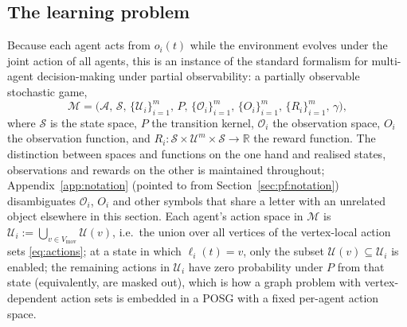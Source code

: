 \documentclass[../main.tex]{subfiles}
\begin{document}
\subsection{The learning problem}
\label{sec:pf:game}

Because each agent acts from $o_i(t)$ while the environment evolves under the
joint action of all agents, this is an instance of the standard formalism for
multi-agent decision-making under partial observability: a partially
observable stochastic game,
\begin{equation}
  \mathcal{M} = \bigl( \mathcal{A},\, \mathcal{S},\, \{\mathcal{U}_i\}_{i=1}^{m},\,
                       P,\, \{\mathcal{O}_i\}_{i=1}^{m},\, \{O_i\}_{i=1}^{m},\,
                       \{R_i\}_{i=1}^{m},\, \gamma \bigr),
  \label{eq:posg}
\end{equation}
where $\mathcal{S}$ is the state space, $P$ the transition kernel,
$\mathcal{O}_i$ the observation space, $O_i$ the observation function, and
$R_i : \mathcal{S} \times \mathcal{U}^m \times \mathcal{S} \to \mathbb{R}$ the
reward function. The distinction between spaces and functions on the one hand and
realised states, observations and rewards on the other is maintained throughout;
Appendix~\ref{app:notation} (pointed to from Section~\ref{sec:pf:notation})
disambiguates $\mathcal{O}_i$, $O_i$ and other symbols that share a letter with
an unrelated object elsewhere in this section.
Each agent's action space in $\mathcal{M}$ is %
$\mathcal{U}_i := \bigcup_{v \in V_{\mathrm{mov}}} \mathcal{U}(v)$, i.e.\ the
union over all vertices of the vertex-local action sets \eqref{eq:actions};
at a state in which $\ell_i(t) = v$, only the subset $\mathcal{U}(v) \subseteq
\mathcal{U}_i$ is enabled; the remaining actions in $\mathcal{U}_i$ have zero
probability under $P$ from that state (equivalently, are masked out), which is
how a graph problem with vertex-dependent action sets is embedded in a POSG with
a fixed per-agent action space.
\end{document}
